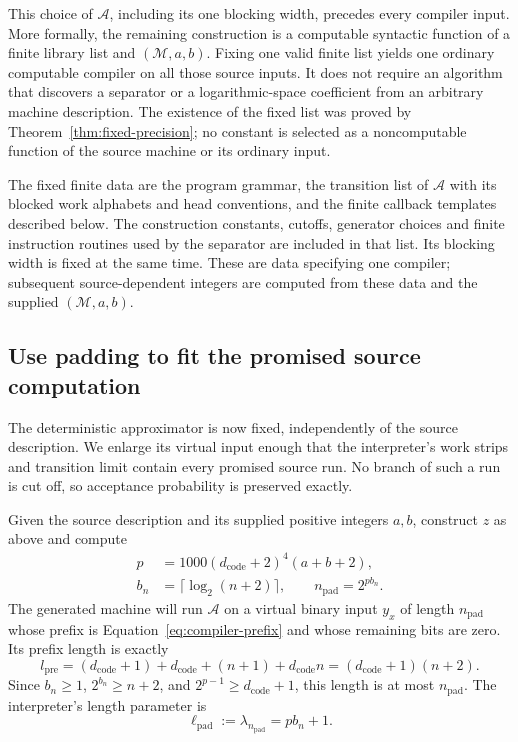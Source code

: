 \documentclass[11pt]{article}
\numberwithin{equation}{section}
\theoremstyle{definition}
\theoremstyle{remark}
\begin{document}
This choice of ${\mathcal{A}}$, including its one blocking width, precedes every
compiler input.  More formally, the remaining construction is a
computable syntactic function of a finite library list and
$({\mathcal{M}},a,b)$.  Fixing one valid finite list yields one ordinary
computable compiler on all those source inputs.  It does not require
an algorithm that discovers a separator or a logarithmic-space
coefficient from an arbitrary machine description.  The existence
of the fixed list was proved by Theorem~\ref{thm:fixed-precision};
no constant is selected as a noncomputable function of the source
machine or its ordinary input.

The fixed finite data are the program grammar, the transition list of
${\mathcal{A}}$ with its blocked work alphabets and head conventions, and the
finite callback templates described below. The construction constants,
cutoffs, generator choices and finite instruction routines used by the
separator are included in that list. Its blocking width is fixed at
the same time. These are data specifying one compiler; subsequent
source-dependent integers are computed from these data and the supplied
$({\mathcal{M}},a,b)$.

\subsection{Use padding to fit the promised source computation}
\label{subsec:compiler-padding}

The deterministic approximator is now fixed, independently of the source description. We enlarge its virtual input enough that the interpreter's work strips and transition limit contain every promised source run. No branch of such a run is cut off, so acceptance probability is preserved exactly.

Given the source description and its supplied positive integers $a,b$, construct $z$ as above and compute
\begin{equation}\label{eq:compiler-padding}
 \begin{split}
 {p}&=1000(d_{\mathrm{code}}+2)^4(a+b+2),\\
 {b}_n&=\lceil\log_2(n+2)\rceil,
 \qquad {n}_{\mathrm{pad}}=2^{{p}{b}_n}.
 \end{split}
\end{equation}
The generated machine will run ${\mathcal{A}}$ on a virtual binary input
$y_x$ of length ${n}_{\mathrm{pad}}$ whose prefix is
Equation~\eqref{eq:compiler-prefix} and whose remaining bits are zero.
Its prefix length is exactly
\begin{equation}\label{eq:compiler-prefix-length}
 {l}_{\mathrm{pre}}
 =(d_{\mathrm{code}}+1)+d_{\mathrm{code}}+(n+1)
       +d_{\mathrm{code}}n
 =(d_{\mathrm{code}}+1)(n+2).
\end{equation}
Since ${b}_n\ge1$, $2^{{b}_n}\ge n+2$, and
$2^{{p}-1}\ge d_{\mathrm{code}}+1$, this length is at most
${n}_{\mathrm{pad}}$.  The interpreter's length parameter is
\begin{equation}\label{eq:compiler-padded-log}
 \ell_{\mathrm{pad}}
 :=\lambda_{{n}_{\mathrm{pad}}}={p}{b}_n+1.
\end{equation}
\end{document}
